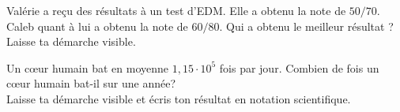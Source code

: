 \vspace{7cm}
\begin{exercise}[points=3]
    Valérie a reçu des résultats à un test d'EDM. Elle a obtenu la note de $50/70$. Caleb quant à lui a obtenu la note de $60/80$. Qui a obtenu le meilleur résultat ?\\
    Laisse ta démarche visible.
\end{exercise}
\begin{solution}

\end{solution}


\vspace{4cm}
\begin{exercise}[points=2]
    Un c\oe ur humain bat en moyenne $ 1,15 \cdot 10^5$ fois par jour. Combien de fois un cœur humain bat-il sur une année? \\
    Laisse ta démarche visible et écris ton résultat en notation scientifique.
\end{exercise}

